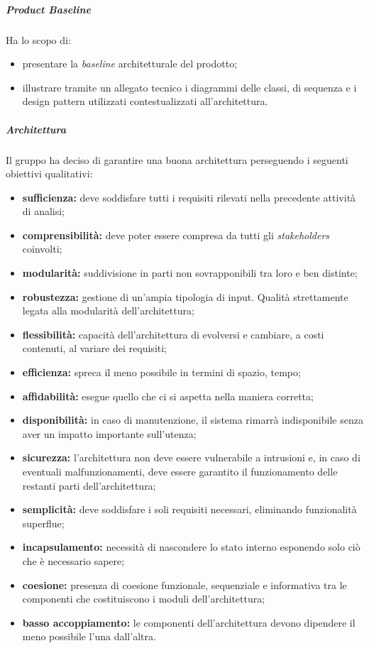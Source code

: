\subparagraph*{Product Baseline\glo}
Ha lo scopo di:
\begin{itemize}
	\item presentare la \textit{baseline\glo} architetturale del prodotto;
	\item illustrare tramite un allegato tecnico i diagrammi delle classi, di sequenza e i design pattern utilizzati contestualizzati all'architettura.
\end{itemize}
\subparagraph*{Architettura}
Il gruppo ha deciso di garantire una buona architettura perseguendo i seguenti obiettivi qualitativi:
\begin{itemize}
	\item \textbf{sufficienza:} deve soddisfare tutti i requisiti rilevati nella precedente attività di analisi;
	\item \textbf{comprensibilità:} deve poter essere compresa da tutti gli \textit{stakeholders\glo} coinvolti;
	\item \textbf{modularità:} suddivisione in parti non sovrapponibili tra loro e ben distinte;
	\item \textbf{robustezza:} gestione di un'ampia tipologia di input. Qualità strettamente legata alla modularità dell'architettura;
	\item \textbf{flessibilità:} capacità dell'architettura di evolversi e cambiare, a costi contenuti, al variare dei requisiti;
	\item \textbf{efficienza:} spreca il meno possibile in termini di spazio, tempo;
	\item \textbf{affidabilità:} esegue quello che ci si aspetta nella maniera corretta;
	\item \textbf{disponibilità:} in caso di manutenzione, il sistema rimarrà indisponibile senza aver un impatto importante sull'utenza;
	\item \textbf{sicurezza:} l'architettura non deve essere vulnerabile a intrusioni e, in caso di eventuali malfunzionamenti, deve essere garantito il funzionamento delle restanti parti dell'architettura;
	\item \textbf{semplicità:} deve soddisfare i soli requisiti necessari, eliminando funzionalità superflue;
	\item \textbf{incapsulamento:} necessità di nascondere lo stato interno esponendo solo ciò che è necessario sapere;
	\item \textbf{coesione:} presenza di coesione funzionale, sequenziale e informativa tra le componenti che costituiscono i moduli dell'architettura;
	\item \textbf{basso accoppiamento:} le componenti dell'architettura devono dipendere il meno possibile l'una dall'altra.
\end{itemize}

